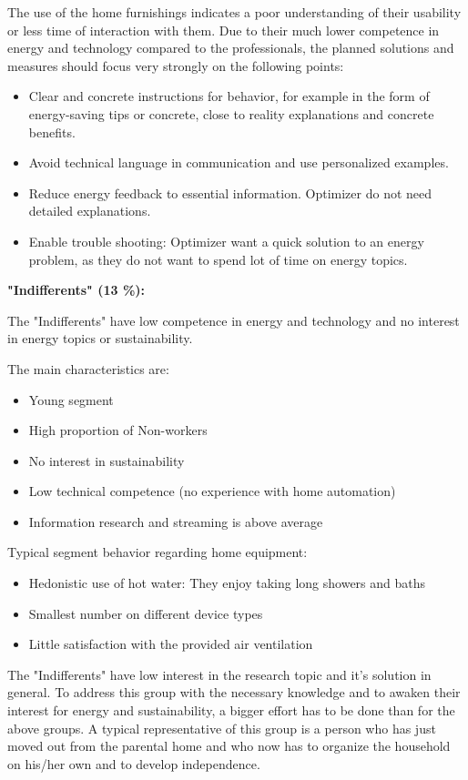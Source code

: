 The use of the home furnishings indicates a poor understanding of their usability or less time of interaction with them. Due to their much lower competence in energy and technology compared to the professionals, the planned solutions and measures should focus very strongly on the following points:

\begin{itemize}
	\item Clear and concrete instructions for behavior, for example in the form of energy-saving tips or concrete, close to reality explanations and concrete benefits.
	\item Avoid technical language in communication and use personalized examples.
	\item Reduce energy feedback to essential information. Optimizer do not need detailed explanations. 
	\item Enable trouble shooting: Optimizer want a quick solution to an energy problem, as they do not want to spend lot of time on energy topics.
\end{itemize}

\textbf{"Indifferents" (13 \%):}

The "Indifferents" have low competence in energy and technology and no interest in energy topics or sustainability.

The main characteristics are:
\begin{itemize}
	\item Young segment
	\item High proportion of Non-workers
	\item No interest in sustainability
	\item Low technical competence (no experience with home automation)
	\item Information research and streaming is above average
\end{itemize}

Typical segment behavior regarding home equipment:
\begin{itemize}
	\item Hedonistic use of hot water: They enjoy taking long showers and baths
	\item Smallest number on different device types
	\item Little satisfaction with the provided air ventilation
\end{itemize}

The "Indifferents" have low interest in the research topic and it's solution in general. To address this group with the necessary knowledge and to awaken their interest for energy and sustainability, a bigger effort has to be done than for the above groups. A typical representative of this group is a person who has just moved out from the parental home and who now has to organize the household on his/her own and to develop independence.

